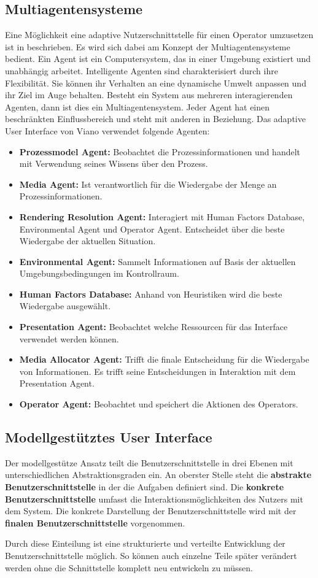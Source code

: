 \subsection{Multiagentensysteme}
Eine Möglichkeit eine adaptive Nutzerschnittstelle für einen Operator umzusetzen ist in \cite{Viano2000} beschrieben. Es wird sich dabei am Konzept der Multiagentensysteme  bedient. Ein Agent ist ein Computersystem, das in einer Umgebung existiert und unabhängig arbeitet. Intelligente Agenten sind charakterisiert durch ihre Flexibilität. Sie können ihr Verhalten an eine dynamische Umwelt anpassen und ihr Ziel im Auge behalten. Besteht ein System aus mehreren interagierenden Agenten, dann ist dies ein Multiagentensystem. Jeder Agent hat einen beschränkten Einflussbereich und steht mit anderen in Beziehung. Das adaptive User Interface von Viano \cite{Viano2000} verwendet folgende Agenten:
\begin{itemize}
\item \textbf{Prozessmodel Agent:} Beobachtet die Prozessinformationen und handelt mit Verwendung seines Wissens über den Prozess.
\item \textbf{Media Agent:} Ist verantwortlich für die Wiedergabe der Menge an Prozessinformationen.
\item \textbf{Rendering Resolution Agent:} Interagiert mit Human Factors Database, Environmental Agent und Operator Agent. Entscheidet über die beste Wiedergabe der aktuellen Situation.
\item \textbf{Environmental Agent:} Sammelt Informationen auf Basis der aktuellen Umgebungsbedingungen im Kontrollraum.
\item \textbf{Human Factors Database:} Anhand von Heuristiken wird die beste Wiedergabe ausgewählt.
\item \textbf{Presentation Agent:} Beobachtet welche Ressourcen für das Interface verwendet werden können.
\item \textbf{Media Allocator Agent:} Trifft die finale Entscheidung für die Wiedergabe von Informationen. Es trifft seine Entscheidungen in Interaktion mit dem Presentation Agent.
\item \textbf{Operator Agent:} Beobachtet und speichert die Aktionen des Operators.
\end{itemize}

\subsection{Modellgestütztes User Interface}
Der modellgestütze Ansatz teilt die Benutzerschnittstelle in drei Ebenen mit unterschiedlichen Abstraktionsgraden ein. An oberster Stelle steht die \textbf{abstrakte Benutzerschnittstelle} in der die Aufgaben definiert sind. Die \textbf{konkrete Benutzerschnittstelle} umfasst die Interaktionsmöglichkeiten des Nutzers mit dem System. Die konkrete Darstellung der Benutzerschnittstelle wird mit der \textbf{finalen Benutzerschnittstelle} vorgenommen. \cite{Meixner2011, Park2015}

Durch diese Einteilung ist eine strukturierte und verteilte Entwicklung der Benutzerschnittstelle möglich. So können auch einzelne Teile später verändert werden ohne die Schnittstelle komplett neu entwickeln zu müssen. \cite{Meixner2011}
